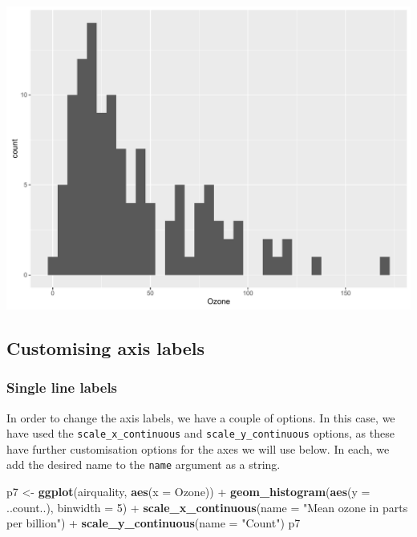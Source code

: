 \documentclass[]{article}
\newenvironment{Shaded}{\begin{snugshade}}{\end{snugshade}}
\newcommand{\KeywordTok}[1]{\textcolor[rgb]{0.13,0.29,0.53}{\textbf{{#1}}}}
\newcommand{\DataTypeTok}[1]{\textcolor[rgb]{0.13,0.29,0.53}{{#1}}}
\newcommand{\DecValTok}[1]{\textcolor[rgb]{0.00,0.00,0.81}{{#1}}}
\newcommand{\StringTok}[1]{\textcolor[rgb]{0.31,0.60,0.02}{{#1}}}
\newcommand{\NormalTok}[1]{{#1}}
\begin{document}
\begin{center}\includegraphics{0_all_posts_pdf/histogram_4-1} \end{center}

\subsection{Customising axis labels}\label{customising-axis-labels}

\subsubsection{Single line labels}\label{single-line-labels}

In order to change the axis labels, we have a couple of options. In this
case, we have used the \texttt{scale\_x\_continuous} and
\texttt{scale\_y\_continuous} options, as these have further
customisation options for the axes we will use below. In each, we add
the desired name to the \texttt{name} argument as a string.

\begin{Shaded}
\begin{Highlighting}[]
\NormalTok{p7 <-}\StringTok{ }\KeywordTok{ggplot}\NormalTok{(airquality, }\KeywordTok{aes}\NormalTok{(}\DataTypeTok{x =} \NormalTok{Ozone)) +}\StringTok{ }
\StringTok{      }\KeywordTok{geom_histogram}\NormalTok{(}\KeywordTok{aes}\NormalTok{(}\DataTypeTok{y =} \NormalTok{..count..), }\DataTypeTok{binwidth =} \DecValTok{5}\NormalTok{) +}
\StringTok{      }\KeywordTok{scale_x_continuous}\NormalTok{(}\DataTypeTok{name =} \StringTok{"Mean ozone in parts per billion"}\NormalTok{) +}
\StringTok{      }\KeywordTok{scale_y_continuous}\NormalTok{(}\DataTypeTok{name =} \StringTok{"Count"}\NormalTok{)}
\NormalTok{p7}
\end{Highlighting}
\end{Shaded}
\end{document}
